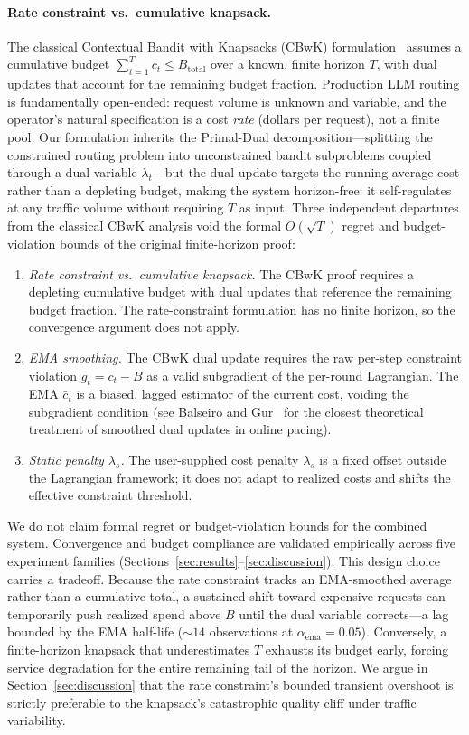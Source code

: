 \paragraph{Rate constraint vs.\ cumulative knapsack.}
The classical Contextual Bandit with Knapsacks (CBwK) formulation~\cite{agrawal2014bandits} assumes a cumulative budget $\sum_{t=1}^T c_t \leq B_{\mathrm{total}}$ over a known, finite horizon $T$, with dual updates that account for the remaining budget fraction.
Production LLM routing is fundamentally open-ended: request volume is unknown and variable, and the operator's natural specification is a cost \emph{rate} (dollars per request), not a finite pool.
Our formulation inherits the Primal-Dual decomposition---splitting the constrained routing problem into unconstrained bandit subproblems coupled through a dual variable $\lambda_t$---but the dual update targets the running average cost rather than a depleting budget, making the system horizon-free: it self-regulates at any traffic volume without requiring $T$ as input.
Three independent departures from the classical CBwK analysis void the formal $O(\sqrt{T})$ regret and budget-violation bounds of the original finite-horizon proof:
\begin{enumerate}[nosep,leftmargin=*]
  \item \emph{Rate constraint vs.\ cumulative knapsack.}  The CBwK proof requires a depleting cumulative budget with dual updates that reference the remaining budget fraction.  The rate-constraint formulation has no finite horizon, so the convergence argument does not apply.
  \item \emph{EMA smoothing.}  The CBwK dual update requires the raw per-step constraint violation $g_t = c_t - B$ as a valid subgradient of the per-round Lagrangian.  The EMA $\bar{c}_t$ is a biased, lagged estimator of the current cost, voiding the subgradient condition (see Balseiro and Gur~\cite{balseiro2019learning} for the closest theoretical treatment of smoothed dual updates in online pacing).
  \item \emph{Static penalty $\lambda_s$.}  The user-supplied cost penalty $\lambda_s$ is a fixed offset outside the Lagrangian framework; it does not adapt to realized costs and shifts the effective constraint threshold.
\end{enumerate}
We do not claim formal regret or budget-violation bounds for the combined system.  Convergence and budget compliance are validated empirically across five experiment families (Sections~\ref{sec:results}--\ref{sec:discussion}).
This design choice carries a tradeoff.
Because the rate constraint tracks an EMA-smoothed average rather than a cumulative total, a sustained shift toward expensive requests can temporarily push realized spend above $B$ until the dual variable corrects---a lag bounded by the EMA half-life (${\sim}14$ observations at $\alpha_{\mathrm{ema}}{=}0.05$).
Conversely, a finite-horizon knapsack that underestimates $T$ exhausts its budget early, forcing service degradation for the entire remaining tail of the horizon.
We argue in Section~\ref{sec:discussion} that the rate constraint's bounded transient overshoot is strictly preferable to the knapsack's catastrophic quality cliff under traffic variability.

